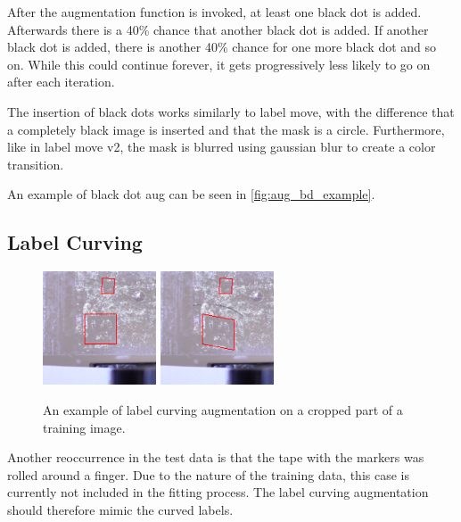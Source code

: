 \documentclass[10pt]{book}
\newcommand{\figureref}[1]{\autoref{#1}}
\begin{document}
After the augmentation function is invoked, at least one black dot is added. Afterwards there is a 40\% chance that another black dot is added. If another black dot is added, there is another 40\% chance for one more black dot and so on. While this could continue forever, it gets progressively less likely to go on after each iteration. 

The insertion of black dots works similarly to label move, with the difference that a completely black image is inserted and that the mask is a circle. Furthermore, like in label move v2, the mask is blurred using gaussian blur to create a color transition.

An example of black dot aug can be seen in \figureref{fig:aug_bd_example}.

\subsection{Label Curving}
\label{sec:label_curving}

\begin{figure}
  \centering
     {\includegraphics[width=0.3\textwidth]{image/aug_lc_before}}
     {\includegraphics[width=0.3\textwidth]{image/aug_lc_after}}
  \caption{An example of label curving augmentation on a cropped part of a training image.}
  \label{fig:aug_lc_example}
\end{figure}

Another reoccurrence in the test data is that the tape with the markers was rolled around a finger. Due to the nature of the training data, this case is currently not included in the fitting process. The label curving augmentation should therefore mimic the curved labels.
\end{document}

